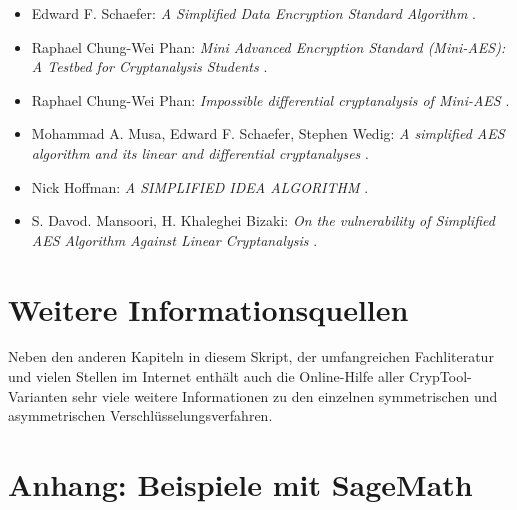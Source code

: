 \begin{refsegment}
\begin{itemize}

\item Edward F. Schaefer: {\em A Simplified Data Encryption Standard Algorithm}
      \cite{Schaefer1996}.

\item Raphael Chung-Wei Phan: {\em Mini Advanced Encryption Standard (Mini-AES):
                                   A Testbed for Cryptanalysis Students}
      \cite{Phan2002}.

\item Raphael Chung-Wei Phan: {\em Impossible differential cryptanalysis of Mini-AES}
      \cite{Phan2003}.

\item Mohammad A. Musa, Edward F. Schaefer, Stephen Wedig:
      {\em A simplified AES algorithm and its linear and differential cryptanalyses}
      \cite{Musa2003}.

\item Nick Hoffman: {\em A SIMPLIFIED IDEA ALGORITHM}
      \cite{Hoffman2006}.

\item S. Davod. Mansoori, H. Khaleghei Bizaki:
      {\em On the vulnerability of Simplified AES Algorithm Against Linear Cryptanalysis}
      \cite{Mansoori2007}.

\end{itemize}



\section{Weitere Informationsquellen}

Neben den anderen Kapiteln in diesem Skript, der umfangreichen Fachliteratur
und vielen Stellen im Internet enthält auch die Online-Hilfe aller
CrypTool-Varianten sehr viele weitere Informationen zu den
einzelnen symmetrischen und asymmetrischen Verschlüsselungsverfahren.




\newpage
\hypertarget{CM_Appendix_SageCode}{}
\section{Anhang: Beispiele mit SageMath}
\label{CM_Sage_samples}


\end{refsegment}
